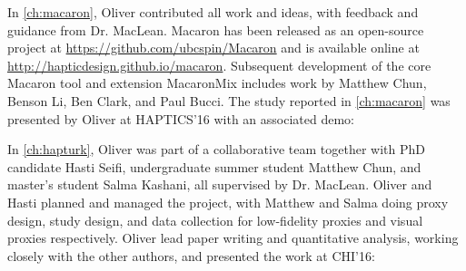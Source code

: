 
\noindent
In \autoref{ch:macaron}, Oliver contributed all work and ideas, with feedback and guidance from Dr. MacLean.
Macaron has been released as an open-source project at \url{https://github.com/ubcspin/Macaron} and is available online at \url{http://hapticdesign.github.io/macaron}.
Subsequent development of the core Macaron tool and extension MacaronMix includes work by Matthew Chun, Benson Li, Ben Clark, and Paul Bucci.
The study reported in \autoref{ch:macaron} was presented by Oliver at HAPTICS'16 with an associated demo: 



\noindent
In \autoref{ch:hapturk}, Oliver was part of a collaborative team together with PhD candidate Hasti Seifi, undergraduate summer student Matthew Chun, and master's student Salma Kashani, all supervised by Dr. MacLean.
Oliver and Hasti planned and managed the project, with Matthew and Salma doing proxy design, study design, and data collection for low-fidelity proxies and visual proxies respectively.
Oliver lead paper writing and quantitative analysis, working closely with the other authors, and presented the work at CHI'16:


